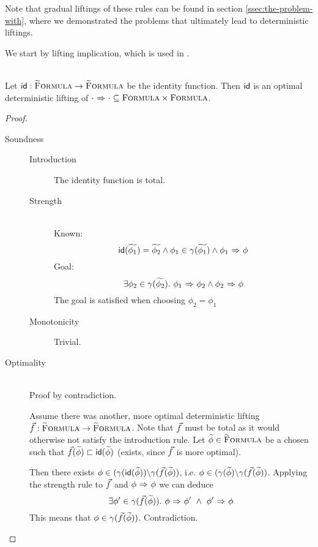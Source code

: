 Note that gradual liftings of these rules can be found in section \ref{ssec:the-problem-with}, where we demonstrated the problems that ultimately lead to deterministic liftings.

We start by lifting implication, which is used in .
\begin{lemma}
    \label{lemma:opt-lift-impl}~\\
    Let $\textup{\textmd{\textsf{id}}} : \textup{\textsc{\ensuremath{\widetilde{\text{F}}}ormula}} \rightarrow \textup{\textsc{\ensuremath{\widetilde{\text{F}}}ormula}}$ be the identity function.
    Then $\textup{\textmd{\textsf{id}}}$ is an optimal deterministic lifting of ${\cdot} \,\,{\Rightarrow}\,\, {\cdot} \subseteq \textup{\textsc{Formula}} \times \textup{\textsc{Formula}}$.
\end{lemma}
\begin{proof}~
    \begin{description}
        \item[Soundness]
        \begin{description}
            \item[Introduction] The identity function is total.
            
            \item[Strength]~\\
            Known:
            $$\textup{\textmd{\textsf{id}}}(\widetilde{\phi_1}) = \widetilde{\phi_2} \wedge \phi_1 \in \gamma(\widetilde{\phi_1}) \wedge {\phi_1} \,\,{\Rightarrow}\,\, {\phi}$$
            Goal:
            $$\exists \phi_2 \in \gamma(\widetilde{\phi_2}).~ {\phi_1} \,\,{\Rightarrow}\,\, {\phi_2} \wedge {\phi_2} \,\,{\Rightarrow}\,\, {\phi}$$
            The goal is satisfied when choosing $\phi_2 = \phi_1$
            
            \item[Monotonicity] Trivial.
        \end{description}
        \item[Optimality]~\\
        Proof by contradiction.
        
        Assume there was another, more optimal deterministic lifting $\vec{f} : \textup{\textsc{\ensuremath{\widetilde{\text{F}}}ormula}} \rightarrow \textup{\textsc{\ensuremath{\widetilde{\text{F}}}ormula}}$.
        Note that $\vec{f}$ must be total as it would otherwise not satisfy the introduction rule.
        Let $\widetilde{\phi} \in \textup{\textsc{\ensuremath{\widetilde{\text{F}}}ormula}}$ be a chosen such that $\vec{f}(\widetilde{\phi}) \sqsubset \textup{\textmd{\textsf{id}}}(\widetilde{\phi})$ (exists, since $\vec{f}$ is more optimal).
        
        Then there exists $\phi \in (\gamma(\textup{\textmd{\textsf{id}}}(\widetilde{\phi})) \backslash \gamma(\vec{f}(\widetilde{\phi}))$, i.e. $\phi \in (\gamma(\widetilde{\phi}) \backslash \gamma(\vec{f}(\widetilde{\phi}))$.
        Applying the strength rule to $\vec{f}$ and ${\phi} \,\,{\Rightarrow}\,\, {\phi}$ we can deduce
        $$\exists \phi' \in \gamma(\vec{f}(\widetilde{\phi})).~ {\phi} \,\,{\Rightarrow}\,\, {\phi'} ~\wedge~ {\phi'} \,\,{\Rightarrow}\,\, {\phi}$$
        This means that $\phi \in \gamma(\vec{f}(\widetilde{\phi}))$.
        Contradiction.
    \end{description}
\end{proof}

